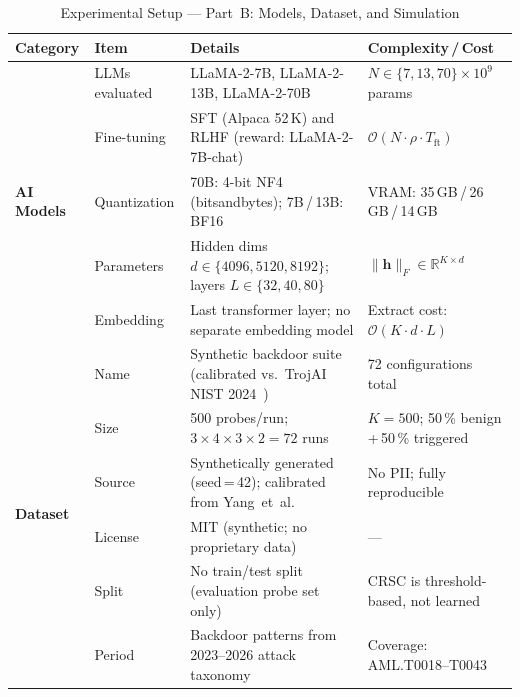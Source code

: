 \begin{table}[t]
\caption{Experimental Setup --- Part~B: Models, Dataset, and Simulation}
\label{tab:setup_exp}
\begin{tabularx}{\textwidth}{@{} p{1.9cm} p{2.4cm} X p{4.5cm} @{}}
\toprule
\textbf{Category} & \textbf{Item} & \textbf{Details} & \textbf{Complexity\,/\,Cost} \\
\midrule

\multirow{5}{*}{\textbf{AI Models}}
  & LLMs evaluated     & LLaMA-2-7B, LLaMA-2-13B, LLaMA-2-70B~\cite{touvron2023llama2}
            & $N \in \{7, 13, 70\}\!\times\!10^9$ params \\
  & Fine-tuning        & SFT (Alpaca 52\,K) and RLHF (reward: LLaMA-2-7B-chat)
            & $\mathcal{O}(N \cdot \rho \cdot T_{\text{ft}})$ \\
  & Quantization       & 70B: 4-bit NF4 (bitsandbytes); 7B\,/\,13B: BF16
            & VRAM: 35\,GB\,/\,26\,GB\,/\,14\,GB \\
  & Parameters         & Hidden dims $d \in \{4096, 5120, 8192\}$; layers $L \in \{32, 40, 80\}$
            & $\|\mathbf{h}\|_F \in \mathbb{R}^{K \times d}$ \\
  & Embedding          & Last transformer layer; no separate embedding model
            & Extract cost: $\mathcal{O}(K \cdot d \cdot L)$ \\
\midrule

\multirow{6}{*}{\textbf{Dataset}}
  & Name        & Synthetic backdoor suite (calibrated vs.\ TrojAI NIST 2024~\cite{trojai2024})
            & 72 configurations total \\
  & Size        & 500 probes/run; $3\!\times\!4\!\times\!3\!\times\!2 = 72$ runs
            & $K\!=\!500$; 50\,\% benign\,+\,50\,\% triggered \\
  & Source      & Synthetically generated (seed\,=\,42); calibrated from Yang~et~al.~\cite{yang2024shadow}
            & No PII; fully reproducible \\
  & License     & MIT (synthetic; no proprietary data)
            & --- \\
  & Split       & No train/test split (evaluation probe set only)
            & CRSC is threshold-based, not learned \\
  & Period      & Backdoor patterns from 2023--2026 attack taxonomy
            & Coverage: AML.T0018--T0043 \\
\midrule


\end{tabularx}
\end{table}
